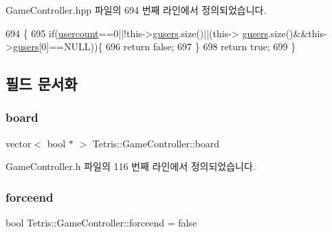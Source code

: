 Game\+Controller.\+hpp 파일의 694 번째 라인에서 정의되었습니다.


\begin{DoxyCode}
694                             \{
695                 \textcolor{keywordflow}{if}(\hyperlink{class_tetris_1_1_game_controller_aafb18b3b4fe5621bfb60fc42b1e8da09}{usercount}==0||!this->\hyperlink{class_tetris_1_1_game_controller_a1a31d3a933daad6d95e20458eea2900e}{gusers}.size()||(this->
      \hyperlink{class_tetris_1_1_game_controller_a1a31d3a933daad6d95e20458eea2900e}{gusers}.size()&&this->\hyperlink{class_tetris_1_1_game_controller_a1a31d3a933daad6d95e20458eea2900e}{gusers}[0]==NULL))\{
696                     \textcolor{keywordflow}{return} \textcolor{keyword}{false};
697                 \}
698                 \textcolor{keywordflow}{return} \textcolor{keyword}{true};
699             \}
\end{DoxyCode}


\subsection{필드 문서화}
\mbox{\label{class_tetris_1_1_game_controller_a7725b6cec9459a6bffaa3e29dd1c5196}} 
\subsubsection{\texorpdfstring{board}{board}}
{\footnotesize\ttfamily vector$<$ bool $\ast$ $>$ Tetris\+::\+Game\+Controller\+::board\hspace{0.3cm}{\ttfamily [protected]}}



Game\+Controller.\+h 파일의 116 번째 라인에서 정의되었습니다.

\mbox{\label{class_tetris_1_1_game_controller_a015411333b232483387d89f3ba0617e0}} 
\subsubsection{\texorpdfstring{forceend}{forceend}}
{\footnotesize\ttfamily bool Tetris\+::\+Game\+Controller\+::forceend = false}



